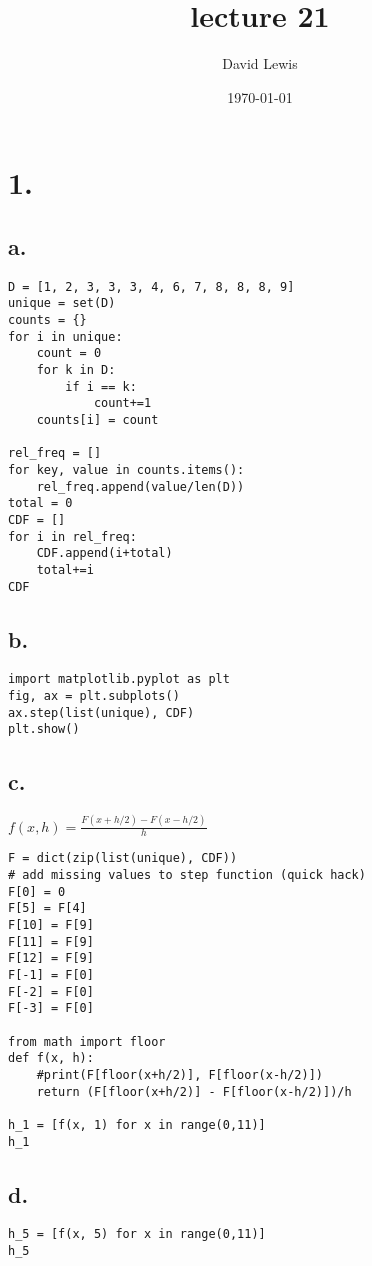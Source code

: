 \documentclass[11pt]{article}
\author{David Lewis}
\date{\today}
\title{lecture 21}
\begin{document}
\maketitle

\section*{1.}
\label{sec:org1877cc5}
\subsection*{a.}
\label{sec:orgb4c3ac8}
\begin{verbatim}
D = [1, 2, 3, 3, 3, 4, 6, 7, 8, 8, 8, 9]
unique = set(D)
counts = {}
for i in unique:
    count = 0
    for k in D:
        if i == k:
            count+=1
    counts[i] = count

rel_freq = []
for key, value in counts.items():
    rel_freq.append(value/len(D))
total = 0
CDF = []
for i in rel_freq:
    CDF.append(i+total)
    total+=i
CDF
\end{verbatim}
\subsection*{b.}
\label{sec:orgb748481}
\begin{verbatim}
import matplotlib.pyplot as plt
fig, ax = plt.subplots()
ax.step(list(unique), CDF)
plt.show()
\end{verbatim}
\subsection*{c.}
\label{sec:org86d9ab2}
\(f(x,h) = \frac{F(x+h/2)- F(x-h/2)}{h}\)

\begin{verbatim}
F = dict(zip(list(unique), CDF))
# add missing values to step function (quick hack)
F[0] = 0
F[5] = F[4]
F[10] = F[9]
F[11] = F[9]
F[12] = F[9]
F[-1] = F[0]
F[-2] = F[0]
F[-3] = F[0]

from math import floor
def f(x, h):
    #print(F[floor(x+h/2)], F[floor(x-h/2)])
    return (F[floor(x+h/2)] - F[floor(x-h/2)])/h

h_1 = [f(x, 1) for x in range(0,11)]
h_1
\end{verbatim}
\subsection*{d.}
\label{sec:org376c7bc}
\begin{verbatim}
h_5 = [f(x, 5) for x in range(0,11)]
h_5
\end{verbatim}
\end{document}
